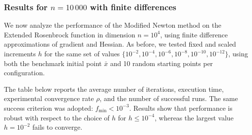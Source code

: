 \documentclass[a4paper,12pt]{article}
\begin{document}
	\newpage
	\subsubsection*{Results for $n = 10\,000$ with finite differences}
	
	We now analyze the performance of the Modified Newton method on the Extended Rosenbrock function in dimension \( n = 10^4 \), using finite difference approximations of gradient and Hessian. As before, we tested fixed and scaled increments \( h \) for the same set of values \( \{10^{-2}, 10^{-4}, 10^{-6}, 10^{-8}, 10^{-10}, 10^{-12}\} \), using both the benchmark initial point \( \bar{x} \) and 10 random starting points per configuration.
	
	The table below reports the average number of iterations, execution time, experimental convergence rate \(\rho\), and the number of successful runs. The same success criterion was adopted: \( f_{\min} < 10^{-3} \). Results show that performance is robust with respect to the choice of \( h \) for \( h \leq 10^{-4} \), whereas the largest value \( h = 10^{-2} \) fails to converge.
	
	\vspace{1em}
	
\end{document}
